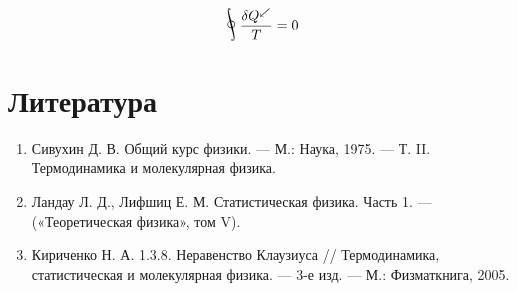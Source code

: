 \documentclass[a4paper,14pt]{article} %
\DeclareMathOperator*{\myoint}{\ThisStyle{\rotatebox{25}{$\SavedStyle\!\oint\!\!\!$}}}
\begin{document}
\begin{equation*}
\myoint \frac{\delta Q^{\swarrow}}{T}=0
\end{equation*}

\section{Литература}

\begin{enumerate}
\item Сивухин Д. В. Общий курс физики. — М.: Наука, 1975. — Т. II. Термодинамика и молекулярная физика.

\item Ландау Л. Д., Лифшиц Е. М. Статистическая физика. Часть 1. — («Теоретическая физика», том V).

\item Кириченко Н. А. 1.3.8. Неравенство Клаузиуса // Термодинамика, статистическая и молекулярная физика. — 3-е изд. — М.: Физматкнига, 2005.
\end{enumerate}
\end{document}
